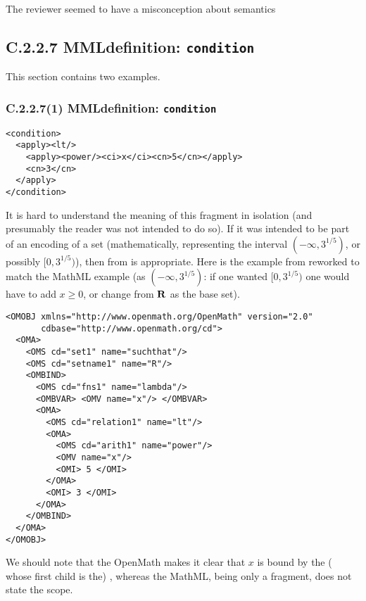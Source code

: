 \documentclass{llncs}
\begin{document}
\begin{newpart}{The reviewer seemed to have a misconception about semantics}
\subsection{C.2.2.7 MMLdefinition: {\tt condition}}
This section contains two examples.
\subsubsection{C.2.2.7(1) MMLdefinition: {\tt condition}}\label{C2271}
\begin{lstlisting}[language=MathML2]
<condition>
  <apply><lt/>
    <apply><power/><ci>x</ci><cn>5</cn></apply>
    <cn>3</cn>
  </apply>
</condition>
\end{lstlisting}
It is hard to understand the meaning of this fragment in isolation (and
presumably the reader was not intended to do so). If it was intended to be
part of an encoding of a set (mathematically, representing the interval
$(-\infty,3^{1/5})$, or possibly $[0,3^{1/5})$), then {} from
{} is appropriate. Here is the example from {} reworked to
match the MathML example (as $(-\infty,3^{1/5})$: if one wanted $[0,3^{1/5})$
one would have to add $x\ge0$, or change from $\bf R$ as the base set).
\begin{lstlisting}
<OMOBJ xmlns="http://www.openmath.org/OpenMath" version="2.0"
       cdbase="http://www.openmath.org/cd">
  <OMA>
    <OMS cd="set1" name="suchthat"/>
    <OMS cd="setname1" name="R"/>
    <OMBIND>
      <OMS cd="fns1" name="lambda"/>
      <OMBVAR> <OMV name="x"/> </OMBVAR>
      <OMA>
        <OMS cd="relation1" name="lt"/>
        <OMA>
          <OMS cd="arith1" name="power"/>
          <OMV name="x"/>
          <OMI> 5 </OMI>
        </OMA>
        <OMI> 3 </OMI>
      </OMA>
    </OMBIND>
  </OMA>
</OMOBJ>
\end{lstlisting}
We should note that the OpenMath makes it clear that $x$ is bound by the
({} whose first child is the)
{}, whereas the MathML, being only a fragment, does not state the
scope.

\end{newpart}
\end{document}
